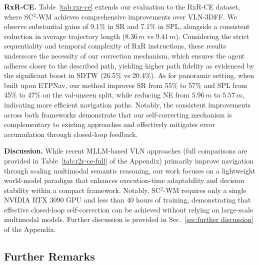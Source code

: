 \documentclass{article}
\theoremstyle{plain}
\theoremstyle{definition}
\theoremstyle{remark}
\begin{document}
\noindent\textbf{RxR-CE.}
Table~\ref{tab:rxr-ce} extends our evaluation to the RxR-CE dataset, where SC$^2$-WM achieves comprehensive improvements over VLN-3DFF. We observe substantial gains of 9.1\% in SR and 7.1\% in SPL, alongside a consistent reduction in average trajectory length ($8.36\,m$ vs $9.41\,m$). Considering the strict sequentiality and temporal complexity of RxR instructions, these results underscore the necessity of our correction mechanism,
which ensures the agent adheres closer to the described path, yielding higher path fidelity as evidenced by the significant boost in SDTW (26.5\% vs 20.4\%).
As for panoramic setting, when built upon ETPNav, our method improves SR from 55\% to 57\% and SPL from 45\% to 47\% on the val-unseen split, while reducing NE from $5.96\,m$ to $5.57\,m$, indicating more efficient navigation paths.
Notably, the consistent improvements across both frameworks demonstrate that our self-correcting mechanism is complementary to existing approaches and effectively mitigates error accumulation through closed-loop feedback.


\noindent\textbf{Discussion.} 
While recent MLLM-based VLN approaches (full comparisons are provided in Table~\ref{tab:r2r-ce-full} of the Appendix) primarily improve navigation through scaling multimodal semantic reasoning, our work focuses on a lightweight world-model paradigm that enhances execution-time adaptability and decision stability within a compact framework. Notably, SC$^2$-WM requires only a single NVIDIA RTX 3090 GPU and less than 40 hours of training, demonstrating that effective closed-loop self-correction can be achieved without relying on large-scale multimodal models. Further discussion is provided in Sec.~\ref{sec:further discussion} of the Appendix.



\subsection{Further Remarks}
\end{document}
